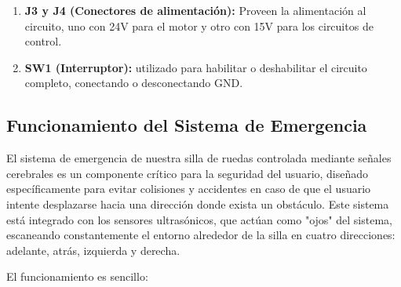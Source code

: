 \documentclass{article}
\begin{document}
\begin{enumerate}
    \item \textbf{J3 y J4 (Conectores de alimentación):} Proveen la alimentación al circuito, uno con 24V para el motor y otro con 15V para los circuitos de control.
    
    \item \textbf{SW1 (Interruptor):}  utilizado para habilitar o deshabilitar el circuito completo, conectando o desconectando GND.
    
\end{enumerate}


\subsection{Funcionamiento del Sistema de Emergencia}
El sistema de emergencia de nuestra silla de ruedas controlada mediante señales cerebrales es un componente crítico para la seguridad del usuario, diseñado específicamente para evitar colisiones y accidentes en caso de que el usuario intente desplazarse hacia una dirección donde exista un obstáculo. Este sistema está integrado con los sensores ultrasónicos, que actúan como "ojos" del sistema, escaneando constantemente el entorno alrededor de la silla en cuatro direcciones: adelante, atrás, izquierda y derecha.

El funcionamiento es sencillo:
\end{document}
